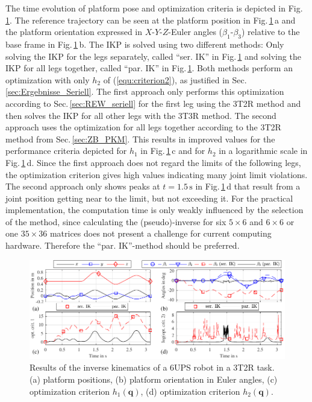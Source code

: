 \documentclass[robotics,article,submit,moreauthors,pdftex]{Definitions/mdpi}
\newcommand{\bm}[1]{\boldsymbol{#1}}
\begin{document}
The time evolution of platform pose and optimization criteria is depicted in Fig.\,\ref{fig:parrob_traj_3T2R}.
The reference trajectory can be seen at the platform position in Fig.\,\ref{fig:parrob_traj_3T2R}\,a and the platform orientation expressed in $X$-$Y$-$Z$-Euler angles ($\beta_1$-$\beta_3$) relative to the base frame in Fig.\,\ref{fig:parrob_traj_3T2R}\,b.
The IKP is solved using two different methods: Only solving the IKP for the legs separately, called ``ser. IK'' in Fig.\,\ref{fig:parrob_traj_3T2R} and solving the IKP for all legs together, called ``par. IK'' in Fig.\,\ref{fig:parrob_traj_3T2R}.
Both methods perform an optimization with only $h_2$ of (\ref{equ:criterion2}), as justified in Sec.\,\ref{sec:Ergebnisse_Seriell}.
The first approach only performs this optimization according to Sec.\,\ref{sec:REW_seriell} for the first leg using the 3T2R method and then solves the IKP for all other legs with the 3T3R method.
The second approach uses the optimization for all legs together according to the 3T2R method from Sec.\,\ref{sec:ZB_PKM}.
This results in improved values for the performance criteria depicted for $h_1$ in Fig.\,\ref{fig:parrob_traj_3T2R}\,c and for $h_2$ in a logarithmic scale in Fig.\,\ref{fig:parrob_traj_3T2R}\,d.
Since the first approach does not regard the limits of the following legs, the optimization criterion gives high values indicating many joint limit violations.
The second approach only shows peaks at $t=1.5\,\mathrm{s}$ in Fig.\,\ref{fig:parrob_traj_3T2R}\,d that result from a joint position getting near to the limit, but not exceeding it.
For the practical implementation, the computation time is only weakly influenced by the selection of the method, since calculating the (pseudo)-inverse for six $5 \times 6$ and $6 \times 6$ or one $35 \times 36$ matrices does not present a challenge for current computing hardware.
Therefore\added[id=Sp]{,} the ``par. IK''-method should be preferred.

%
\begin{figure}[b]
	\vspace{-0.5cm} %
	\includegraphics{parrob_traj_results1.pdf}
	\caption{Results of the inverse kinematics of a 6UPS robot in a 3T2R task. (a) platform positions, (b) platform orientation in Euler angles, (c) optimization criterion $h_1(\bm{{q}})$, (d) optimization criterion $h_2(\bm{{q}})$.}
	\label{fig:parrob_traj_3T2R}
\end{figure} 
\end{document}
